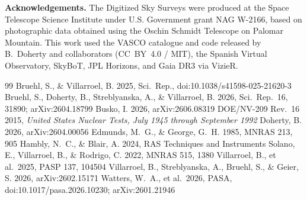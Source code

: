 \documentclass[11pt,a4paper]{article}
\begin{document}
\textbf{Acknowledgements.} The Digitized Sky Surveys were produced at the Space Telescope Science Institute under U.S.
Government grant NAG W-2166, based on photographic data obtained using the Oschin Schmidt Telescope on Palomar Mountain.
This work used the VASCO catalogue and code released by B.\ Doherty and collaborators (CC~BY~4.0 / MIT), the Spanish
Virtual Observatory, SkyBoT, JPL Horizons, and Gaia DR3 via VizieR.

\small
\begin{thebibliography}{99}\itemsep0pt
 Bruehl, S., \& Villarroel, B. 2025, Sci.\ Rep., doi:10.1038/s41598-025-21620-3
 Bruehl, S., Doherty, B., Streblyanska, A., \& Villarroel, B. 2026, Sci.\ Rep.\ 16, 31890; arXiv:2604.18799
 Busko, I. 2026, arXiv:2606.08319
 DOE/NV-209 Rev.~16 2015, \emph{United States Nuclear Tests, July 1945 through September 1992}
 Doherty, B. 2026, arXiv:2604.00056
 Edmunds, M.~G., \& George, G.~H. 1985, MNRAS 213, 905
 Hambly, N.~C., \& Blair, A. 2024, RAS Techniques and Instruments
 Solano, E., Villarroel, B., \& Rodrigo, C. 2022, MNRAS 515, 1380
 Villarroel, B., et al.\ 2025, PASP 137, 104504
 Villarroel, B., Streblyanska, A., Bruehl, S., \& Geier, S. 2026, arXiv:2602.15171
 Watters, W.~A., et al.\ 2026, PASA, doi:10.1017/pasa.2026.10230; arXiv:2601.21946
\end{thebibliography}
\end{document}
